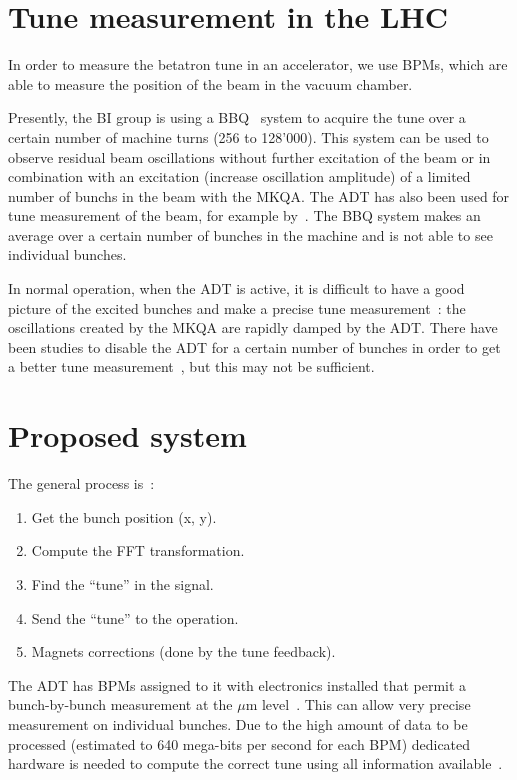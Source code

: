 \section{Tune measurement in the LHC}

In order to measure the betatron tune in an accelerator, we use
\glspl{BPM}, which are able to measure the position of the beam in the
vacuum chamber.

Presently, the \gls{BI} group is using a \gls{BBQ}~\cite{Boccardi:1156349} system to acquire the tune over a certain number of machine turns (256 to 128'000). This system can be used to observe residual beam oscillations without further excitation of the beam or in combination with an excitation (increase oscillation amplitude) of a limited number of \glspl{bunch} in the beam with the \gls{MKQA}. The \Gls{ADT} has also been used for tune measurement of the beam, for example by~\cite{HofleEvian10}. The \gls{BBQ} system makes an average over a certain number of bunches in the machine and is not able to see individual bunches.

In normal operation, when the \gls{ADT} is active, it is difficult to have a good picture of the excited bunches and make a precise tune measurement~: the oscillations created by the \gls{MKQA} are rapidly damped by the \gls{ADT}. There have been studies to disable the \gls{ADT} for a certain number of bunches in order to get a better tune measurement~\cite{HofleEvian11}, but this may not be sufficient.

\section{Proposed system}

The general process is~:
\begin{enumerate}
\item Get the bunch position (x, y).
\item Compute the \gls{FFT} transformation.
\item Find the ``tune'' in the signal.
\item Send the ``tune'' to the operation.
\item Magnets corrections (done by the tune feedback).
\end{enumerate}

The \gls{ADT} has \glspl{BPM} assigned to it with electronics installed that permit a bunch-by-bunch measurement at the $\mu$m level~\cite{BphMeas07}. This can allow very precise measurement on individual bunches. Due to the high amount of data to be processed (estimated to 640 mega-bits per second for each \gls{BPM}) dedicated hardware is needed to compute the correct tune using all information available~\cite{HofleChamonix12}.

